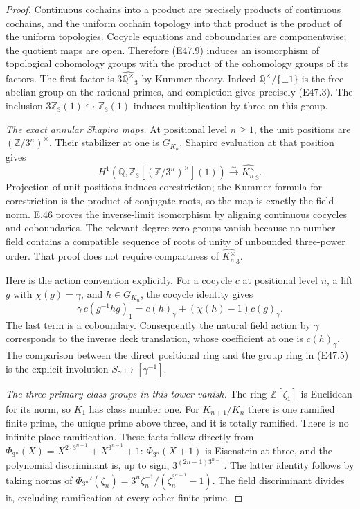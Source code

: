 \begin{proof}
Continuous cochains into a product are precisely
products of continuous cochains, and the uniform
cochain topology into that product is the product
of the uniform topologies. Cocycle equations and
coboundaries are componentwise; the quotient maps
are open. Therefore (E47.9) induces an isomorphism
of topological cohomology groups with the product
of the cohomology groups of its factors. The first
factor is $3\widehat{\mathbb Q^\times}_3$ by Kummer
theory. Indeed $\mathbb Q^\times/\{\pm1\}$ is the
free abelian group on the rational primes, and
completion gives precisely (E47.3). The inclusion
$3\mathbb Z_3(1)\hookrightarrow\mathbb Z_3(1)$
induces multiplication by three on this group.

\emph{The exact annular Shapiro maps.}
At positional level $n\ge1$, the unit positions
are $(\mathbb Z/3^n)^\times$. Their stabilizer at
one is $G_{K_n}$. Shapiro evaluation at that
position gives
\[
 H^1(\mathbb Q,
      \mathbb Z_3[(\mathbb Z/3^n)^\times](1))
       \xrightarrow{\sim}\widehat{K_n^\times}_3.
 \tag{E47.11}
\]
Projection of unit positions induces corestriction;
the Kummer formula for corestriction is the product
of conjugate roots, so the map is exactly the field
norm. E.46 proves the inverse-limit isomorphism
by aligning continuous cocycles and coboundaries.
The relevant degree-zero groups vanish because
no number field contains a compatible sequence
of roots of unity of unbounded three-power order.
That proof does not require compactness of
$\widehat{K_n^\times}_3$.

Here is the action convention explicitly. For a
cocycle $c$ at positional level $n$, a lift $g$
with $\chi(g)=\gamma$, and $h\in G_{K_n}$, the
cocycle identity gives
\[
 \gamma\,c(g^{-1}hg)_1
       =c(h)_\gamma+(\chi(h)-1)c(g)_\gamma.
 \tag{E47.12}
\]
The last term is a coboundary. Consequently the
natural field action by $\gamma$ corresponds to
the inverse deck translation, whose coefficient
at one is $c(h)_\gamma$. The comparison between
the direct positional ring and the group ring
in (E47.5) is the explicit involution
$S_\gamma\mapsto[\gamma^{-1}]$.

\emph{The three-primary class groups in this tower vanish.}
The ring $\mathbb Z[\zeta_1]$ is Euclidean for
its norm, so $K_1$ has class number one.
For $K_{n+1}/K_n$ there is one ramified finite
prime, the unique prime above three, and it is
totally ramified. There is no infinite-place
ramification. These facts follow directly from
$\Phi_{3^n}(X)=X^{2\cdot3^{n-1}}+X^{3^{n-1}}+1$:
$\Phi_{3^n}(X+1)$ is Eisenstein at three, and
the polynomial discriminant is, up to sign,
$3^{(2n-1)3^{n-1}}$. The latter identity follows
by taking norms of
$\Phi_{3^n}'(\zeta_n)=
3^n\zeta_n^{-1}/(\zeta_n^{3^{n-1}}-1)$.
The field discriminant divides it, excluding
ramification at every other finite prime.


\end{proof}
